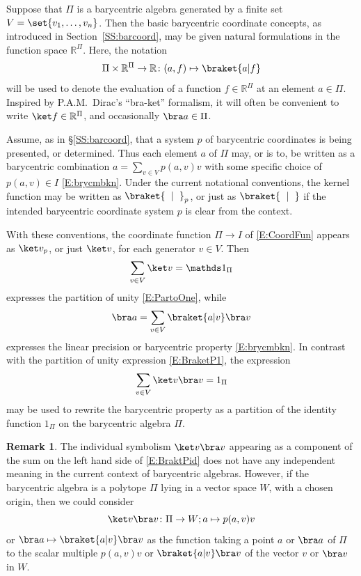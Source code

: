 \documentclass[12pt]{amsart}
\theoremstyle{plain}
\theoremstyle{definition}
\newtheorem{remark}[theorem]{Remark}
\numberwithin{equation}{section}
\begin{document}
Suppose that $\Pi$ is a barycentric algebra generated by a finite set $V=\set{v_1,\dots,v_n}$. Then the basic barycentric coordinate concepts, as introduced in Section~\ref{SS:barcoord}, may be given natural formulations in the function space $\mathbb R^\Pi$. Here, the notation
\begin{equation}\label{E:brac-ket}
\Pi\times\mathbb R^\Pi\to\mathbb R\colon(a,f)\mapsto\braket{a|f}
\end{equation}
will be used to denote the evaluation of a function $f\in\mathbb R^\Pi$ at an element $a\in\Pi$. Inspired by P.A.M.~Dirac's ``bra-ket'' formalism, it will often be convenient to write $\ket f\in\mathbb R^\Pi$, and occasionally $\bra a\in\Pi$.



Assume, as in \S\ref{SS:barcoord}, that a system $p$ of barycentric coordinates is being presented, or determined. Thus each element $a$ of $\Pi$ may, or is to, be written as a barycentric combination
$a=\sum_{v\in V}p(a,v)v$
with some specific choice of $p(a,v)\in I$ \eqref{E:brycmbkn}. Under the current notational conventions, the kernel function may be written as $\braket{\phantom n|\phantom n}_p$, or just as $\braket{\phantom n|\phantom n}$ if the intended barycentric coordinate system $p$ is clear from the context.


With these conventions, the coordinate function $\Pi\to I$ of \eqref{E:CoordFun} appears as $\ket v_p$, or just $\ket v$, for each generator $v\in V$. Then
\begin{equation}\label{E:BraketP1}
\sum_{v\in V}\ket v=\mathds 1_\Pi
\end{equation}
expresses the partition of unity \eqref{E:PartoOne}, while
\begin{equation}\label{E:LinPrcsn}
\bra a=\sum_{v\in V}\braket{a|v}\bra v
\end{equation}
expresses the linear precision or barycentric property \eqref{E:brycmbkn}. In contrast with the partition of unity expression \eqref{E:BraketP1}, the expression
\begin{equation}\label{E:BraktPid}
\sum_{v\in V}\ket v\bra v=1_\Pi
\end{equation}
may be used to rewrite the barycentric property as a partition of the identity function $1_\Pi$ on the barycentric algebra $\Pi$.


\begin{remark}
The individual symbolism $\ket v\bra v$ appearing as a component of the sum on the left hand side of \eqref{E:BraktPid} does not have any independent meaning in the current context of barycentric algebras. However, if the barycentric algebra is a polytope $\Pi$ lying in a vector space $W$, with a chosen origin, then we could consider
$$
\ket v\bra v\colon\Pi\to W;a\mapsto p(a,v)v
$$
or $\bra a\mapsto\braket{a|v}\bra v$
as the function taking a point $a$ or $\bra a$ of $\Pi$ to the scalar multiple $p(a,v)v$ or $\braket{a|v}\bra v$ of the vector $v$ or $\bra v$ in $W$.
\end{remark}
\end{document}
